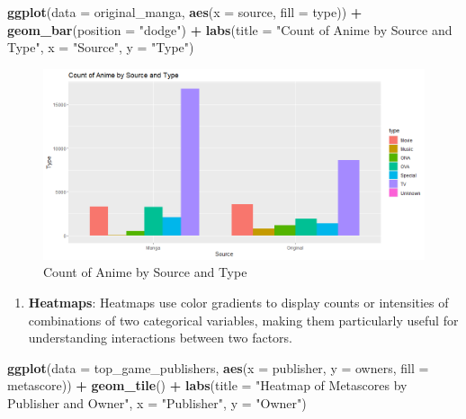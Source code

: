 \documentclass[
]{book}
\newenvironment{Shaded}{\begin{snugshade}}{\end{snugshade}}
\newcommand{\AttributeTok}[1]{\textcolor[rgb]{0.13,0.29,0.53}{#1}}
\newcommand{\FunctionTok}[1]{\textcolor[rgb]{0.13,0.29,0.53}{\textbf{#1}}}
\newcommand{\NormalTok}[1]{#1}
\newcommand{\SpecialCharTok}[1]{\textcolor[rgb]{0.81,0.36,0.00}{\textbf{#1}}}
\newcommand{\StringTok}[1]{\textcolor[rgb]{0.31,0.60,0.02}{#1}}
\providecommand{\tightlist}{%
  \setlength{\itemsep}{0pt}\setlength{\parskip}{0pt}}
\begin{document}
\begin{Shaded}
\begin{Highlighting}[]
\FunctionTok{ggplot}\NormalTok{(}\AttributeTok{data =}\NormalTok{ original\_manga, }\FunctionTok{aes}\NormalTok{(}\AttributeTok{x =}\NormalTok{ source, }\AttributeTok{fill =}\NormalTok{ type)) }\SpecialCharTok{+}
  \FunctionTok{geom\_bar}\NormalTok{(}\AttributeTok{position =} \StringTok{"dodge"}\NormalTok{) }\SpecialCharTok{+}
  \FunctionTok{labs}\NormalTok{(}\AttributeTok{title =} \StringTok{"Count of Anime by Source and Type"}\NormalTok{, }\AttributeTok{x =} \StringTok{"Source"}\NormalTok{, }\AttributeTok{y =} \StringTok{"Type"}\NormalTok{)}
\end{Highlighting}
\end{Shaded}

\begin{figure}
\centering
\includegraphics[width=1\textwidth,height=\textheight]{images/count_plots.png}
\caption{Count of Anime by Source and Type}
\end{figure}

\begin{enumerate}
\def\labelenumi{\arabic{enumi}.}
\setcounter{enumi}{1}
\tightlist
\item
  \textbf{Heatmaps}: Heatmaps use color gradients to display counts or intensities of combinations of two categorical variables, making them particularly useful for understanding interactions between two factors.
\end{enumerate}

\begin{Shaded}
\begin{Highlighting}[]
\FunctionTok{ggplot}\NormalTok{(}\AttributeTok{data =}\NormalTok{ top\_game\_publishers, }\FunctionTok{aes}\NormalTok{(}\AttributeTok{x =}\NormalTok{ publisher, }\AttributeTok{y =}\NormalTok{ owners, }\AttributeTok{fill =}\NormalTok{ metascore)) }\SpecialCharTok{+}
  \FunctionTok{geom\_tile}\NormalTok{() }\SpecialCharTok{+}
  \FunctionTok{labs}\NormalTok{(}\AttributeTok{title =} \StringTok{"Heatmap of Metascores by Publisher and Owner"}\NormalTok{, }\AttributeTok{x =} \StringTok{"Publisher"}\NormalTok{, }\AttributeTok{y =} \StringTok{"Owner"}\NormalTok{)}
\end{Highlighting}
\end{Shaded}
\end{document}
